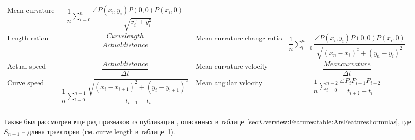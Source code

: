 \documentclass[12pt]{article}
\begin{document}
\begin{table}[h]
\begin{tabular}[c]{ || m{20mm} | c || m{20mm} | c ||}
            Mean curvature & {\centering $ \dfrac{1}{n} \sum\limits_{i=0}^{n} \dfrac{\angle P(x_i, y_i)P(0,0)P(x_i, 0)}{\sqrt{x_{i}^2 + y_{i}^2}} $} \\
            \hhline{||-|-||-|-||}
            Length ration & {\centering $ \dfrac{Curvelength}{Actualdistance} $} &
            Mean curvature change ratio & {\centering $ \dfrac{1}{n} \sum\limits_{i=0}^{n} \dfrac{\angle P(x_i, y_i)P(0,0)P(x_i, 0)}{\sqrt{(x_n-x_i)^2 + (y_n-y_i)^2}} $} \\
            \hhline{||-|-||-|-||}
            Actual speed & {\centering $ \dfrac{Actualdistance}{\Delta t} $} &
            Mean curvature velocity & {\centering $ \dfrac{Meancurvature}{\Delta t} $} \\
            \hhline{||-|-||-|-||}
            Curve speed & {\centering $ \dfrac{1}{n} \sum\limits_{i=0}^{n-1} \dfrac{\sqrt{(x_i-x_{i+1})^2 + (y_i-y_{i+1})^2}}{t_{i+1} - t_i} $} &
            Mean angular velocity & {\centering $ \dfrac{1}{n} \sum\limits_{i=0}^{n-2} \dfrac{\angle P_i P_{i+1} P_{i+2}}{t_{i+2} - t_i} $} \\
            \hhline{|b:==:b:==:b|} 
        \end{tabular}
        \label{sec:Overview:Features:table:FeaturesFormulas}
    \end{table}

    \par Также был рассмотрен еще ряд признаков из публикации \cite{ArsFeature}, описанных в таблице~\ref{sec:Overview:Features:table:ArsFeaturesFormulas}, где $S_{n-1}$ -- длина траектории (см. curve length в таблице~\ref{sec:Overview:Features:table:FeaturesFormulas}).
\end{document}
